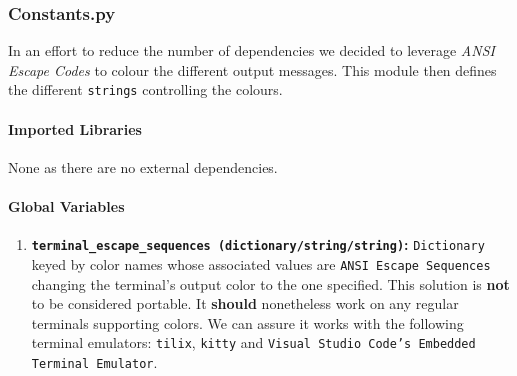 \subsubsection{Constants.py}
    In an effort to reduce the number of dependencies we decided to leverage \textit{ANSI Escape Codes} to colour the different output messages. This module then defines the different \texttt{strings} controlling the colours.

    \paragraph{Imported Libraries}
        None as there are no external dependencies.

    \paragraph{Global Variables}
        \begin{enumerate}
            \item \textbf{\texttt{terminal\_escape\_sequences (dictionary/string/string)}:} \texttt{Dictionary} keyed by color names whose associated values are \texttt{ANSI Escape Sequences} changing the terminal's output color to the one specified. This solution is \textbf{not} to be considered portable. It \textbf{should} nonetheless work on any regular terminals supporting colors. We can assure it works with the following terminal emulators: \texttt{tilix}, \texttt{kitty} and \texttt{Visual Studio Code's Embedded Terminal Emulator}.
        \end{enumerate}
